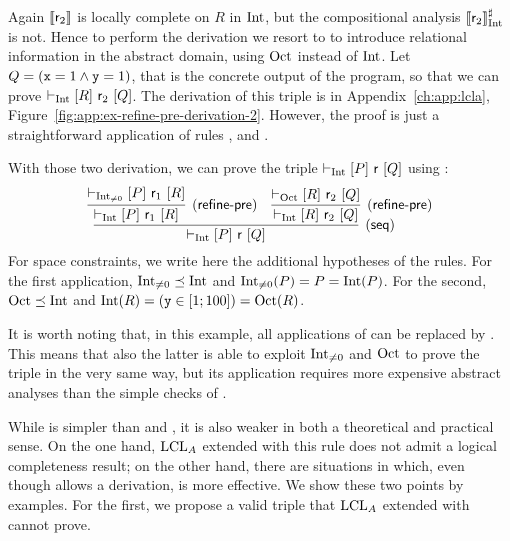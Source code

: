 \begin{example}
	Again $\llbracket\mathsf{r}_2\rrbracket$ is locally complete on $R$ in $\text{Int}$, but the compositional analysis $\llbracket\mathsf{r}_2\rrbracket^{\sharp}_{\text{Int}}$ is not. Hence to perform the derivation we resort to  to introduce relational information in the abstract domain, using $\text{Oct}$ instead of $\text{Int}$. Let $Q = (\texttt{x} = 1 \land \texttt{y} = 1)$, that is the concrete output of the program, so that we can prove $\vdash_{\text{Int}}\nobreak[R]~\mathsf{r}_2~[Q]$.
	The derivation of this triple is in Appendix~\ref{ch:app:lcla}, Figure~\ref{fig:app:ex-refine-pre-derivation-2}. However, the proof is just a straightforward application of rules ,  and .
	
	With those two derivation, we can prove the triple $\vdash_{\text{Int}}\nobreak[P]~\mathsf{r}~[Q]$ using :
	\[
	\infer[(\mathsf{seq})]
	{\lcl{\Int}{P}{\regr}{Q}}
	{
		\infer[(\mathsf{refine\mbox{-}pre})]
		{\lcl{\Int}{P}{\regr_1}{R}}
		{\lcl{\Int_{\neq 0}}{P}{\regr_1}{R}}
		&
		\infer[(\mathsf{refine\mbox{-}pre})]
		{\lcl{\Int}{R}{\regr_2}{Q}}
		{\lcl{\Oct}{R}{\regr_2}{Q}}
	}
	\]
	For space constraints, we write here the additional hypotheses of the rules. For the first application, $\text{Int}_{\neq 0} \preceq \text{Int}$ and $\text{Int}_{\neq 0}(P) = P = \text{Int}(P)$. For the second, $\text{Oct} \preceq \text{Int}$ and $\text{Int}(R) = (\texttt{y} \in [1; 100]) = \text{Oct}(R)$.
	
	It is worth noting that, in this example, all applications of  can be replaced by . This means that also the latter is able to exploit $\text{Int}_{\neq 0}$ and $\text{Oct}$ to prove the triple in the very same way, but its application requires more expensive abstract analyses than the simple checks of .
\end{example}

While  is simpler than  and , it is also weaker in both a theoretical and practical sense. On the one hand, $\text{LCL}_A$ extended with this rule does not admit a logical completeness result; on the other hand, there are situations in which, even though  allows a derivation,  is more effective. We show these two points by examples.
For the first, we propose a valid triple that $\text{LCL}_A$ extended with  cannot prove.

